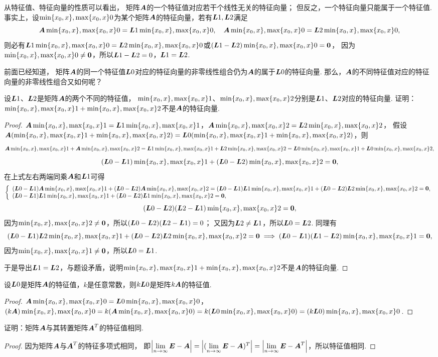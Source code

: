 从特征值、特征向量的性质可以看出，
矩阵\(\A\)的一个特征值对应若干个线性无关的特征向量；
但反之，一个特征向量只能属于一个特征值.
事实上，设\(\X0\)为某个矩阵\(\A\)的特征向量，若有\(\L{1},\L{2}\)满足\[
	\A\X0=\L{1}\X0,
	\quad
	\A\X0=\L{2}\X0,
\]
则必有\(\L{1}\X0=\L{2}\X0\)或\((\L{1}-\L{2})\X0=\z\)，
因为\(\X0\neq\z\)，所以\(\L{1}-\L{2}=0\)，\(\L{1}=\L{2}\).

前面已经知道，
矩阵\(\A\)的同一个特征值\(\L0\)对应的特征向量的非零线性组合仍为\(\A\)的属于\(\L0\)的特征向量.
那么，\(\A\)的不同特征值对应的特征向量的非零线性组合又如何呢？
\begin{example}
设\(\L{1}\)、\(\L{2}\)是矩阵\(\A\)的两个不同的特征值，
\(\X1\)、\(\X2\)分别是\(\L{1}\)、\(\L{2}\)对应的特征向量.
证明：\(\X1+\X2\)不是\(\A\)的特征向量.
\begin{proof}
\(\A\X1 = \L{1}\X1\)，\(\A\X2 = \L{2}\X2\)，
假设\(\A(\X1+\X2) = \L0(\X1+\X2)\)，则\[
	\A\X1+\A\X2 =\L{1}\X1+\L{2}\X2 = \L0\X1+\L0\X2,
\]\[
	(\L0-\L{1})\X1+(\L0-\L{2})\X2 = \z,
\]
在上式左右两端同乘\(\A\)和\(\L{1}\)可得\[
	\left\{ \begin{array}{l}
		(\L0-\L{1})\A\X1+(\L0-\L{2})\A\X2 = (\L0-\L{1})\L{1}\X1 + (\L0-\L{2})\L{2}\X2 = \z, \\
		(\L0-\L{1})\L{1}\X1+(\L0-\L{2})\L{1}\X2 = \z,
	\end{array} \right.
\]\[
	(\L0-\L{2})(\L{2}-\L{1})\X2 = \z,
\]
因为\(\X2\neq\z\)，所以\((\L0-\L{2})(\L{2}-\L{1})=0\)；
又因为\(\L{2}\neq\L{1}\)，所以\(\L0=\L{2}\).
同理有\[
	(\L0-\L{1})\L{2}\X1+(\L0-\L{2})\L{2}\X2 = \z
	\implies
	(\L0-\L{1})(\L{1}-\L{2})\X1 = \z,
\]
因为\(\X1\neq\z\)，所以\(\L0=\L{1}\).

于是导出\(\L{1}=\L{2}\)，与题设矛盾，说明\(\X1+\X2\)不是\(\A\)的特征向量.
\end{proof}
\end{example}

\begin{example}
设\(\L0\)是矩阵\(\A\)的特征值，\(k\)是任意常数，则\(k\L0\)是矩阵\(k\A\)的特征值.
\begin{proof}
\(\A\X0=\L0\X0\)，\((k\A)\X0=k(\A\X0)=k(\L0\X0)=(k\L0)\X0\).
\end{proof}
\end{example}

\begin{example}
证明：矩阵\(\A\)与其转置矩阵\(\A^T\)的特征值相同.
\begin{proof}
因为矩阵\(\A\)与\(\A^T\)的特征多项式相同，
即\(\abs{\l\E-\A} = \abs{(\l\E-\A)^T} = \abs{\l\E-\A^T}\)，所以特征值相同.
\end{proof}
\end{example}

